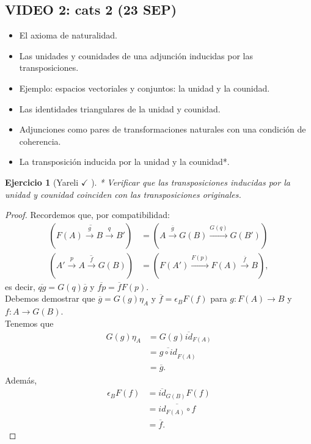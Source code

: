 \documentclass[12pt,letterpaper,titlepage]{article}
\newtheorem{exe}{Ejercicio}
\theoremstyle{definition}
\newcommand\ol[1]{\overline{#1}}
\newcommand\rar[1]{\xrightarrow{#1}}
\newcommand\<{\langle}
\renewcommand\>{\rangle}
\begin{document}
\subsection{VIDEO 2: cats 2 (23 SEP)}
\begin{itemize}
  \item El axioma de naturalidad.
  \item Las unidades y counidades de una adjunción inducidas por
    las transposiciones.
  \item Ejemplo: espacios vectoriales y conjuntos: la unidad y la
    counidad.
  \item Las identidades triangulares de la unidad y counidad.
  \item Adjunciones como pares de transformaciones naturales con
    una condición de coherencia.
  \item La transposición inducida por la unidad y la counidad*.
\end{itemize}
\begin{exe}[Yareli $\checkmark$ ]
  * Verificar que las transposiciones inducidas por la
  unidad y counidad coinciden con las transposiciones
  originales.
\end{exe}
\begin{proof}
    Recordemos que, por compatibilidad:
    \begin{align*}
        \left(\ol{F(A)\rar g B \rar q B'}\right)
        &=
        \left(A\rar{\ol g} G(B) \rar{G(q)}G(B')\right) \\
        \left(\ol{A'\rar p A \rar f G(B)}\right)
        &=
        \left(F(A')\rar{F(p)} F(A) \rar{\ol f}B\right),
    \end{align*}
    es decir, $\ol{qg}=G(q)\ol g$ y $\ol{fp}=\ol f F(p)$.\\
    Debemos demostrar que $\overline{g}=G(g)\eta_A$ y $\overline{f}=\epsilon_BF(f)$ para $g\colon F(A)\to B$ y $f\colon A\to G(B)$.\\
Tenemos que
\begin{align*}
G(g)\eta_A&=G(g)\overline{id}_{F(A)}\\
&=\overline{g\circ id}_{F(A)}\\
&=\overline{g}.
\end{align*}
Además, 
\begin{align*}
\epsilon_B F(f)&=\overline{id}_{G(B)}F(f)\\
&=\overline{id_{F(A)}\circ f}\\
&=\overline{f}.
\end{align*}
\end{proof}
\end{document}
